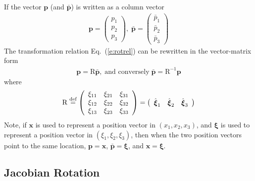 \documentclass[a4paper,12pt,dvips]{article}
\newcommand*\defeq{\buildrel{\text{def}}\over{=}}
\begin{document}
If the vector $\mathbf{p}$ (and $\bar{\mathbf{p}}$) is written as a column
vector
\begin{align*}
  \mathbf{p} = \left(\begin{array}{c}
    p_1 \\ p_2 \\ p_3
  \end{array}\right), \;
  \bar{\mathbf{p}} = \left(\begin{array}{c}
    \bar{p}_1 \\ \bar{p}_2 \\ \bar{p}_3
  \end{array}\right)
\end{align*}
The transformation relation Eq.~(\ref{e:rotrel}) can be rewritten in the
vector-matrix form
\begin{align}
  \mathbf{p} = \mathrm{R}\bar{\mathbf{p}},
  \; \mbox{and conversely} \;
  \bar{\mathbf{p}} = \mathrm{R}^{-1}\mathbf{p}
  \label{e:rotmv}
\end{align}
where
\begin{align}
  \mathrm{R}
  \defeq \left(\begin{array}{ccc}
    \xi_{11} & \xi_{21} & \xi_{31} \\
    \xi_{12} & \xi_{22} & \xi_{32} \\
    \xi_{13} & \xi_{23} & \xi_{33}
  \end{array}\right)
  = \left(\begin{array}{ccc}
    \hat{\boldsymbol{\xi}}_1 &
    \hat{\boldsymbol{\xi}}_2 &
    \hat{\boldsymbol{\xi}}_3
  \end{array}\right)
  \label{e:rotmat}
\end{align}
Note, if $\mathbf{x}$ is used to represent a position vector in $(x_1, x_2,
x_3)$, and $\boldsymbol{\xi}$ is used to represent a position vector in
$(\xi_1, \xi_2, \xi_3)$, then when the two position vectors point to the same
location, $\mathbf{p} = \mathbf{x}$, $\bar{\mathbf{p}} = \boldsymbol{\xi}$, and
$\mathbf{x} = \boldsymbol{\xi}$.

\subsection{Jacobian Rotation}
\end{document}
